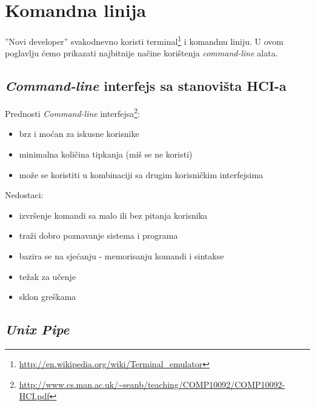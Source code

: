 \documentclass[times, utf8, seminar]{fit}
\begin{document}
\chapter{Komandna linija}

''Novi developer'' svakodnevno koristi terminal\footnote{\url{http://en.wikipedia.org/wiki/Terminal_emulator}} i komandnu liniju. U ovom poglavlju ćemo prikazati najbitnije načine korištenja \emph{command-line} alata.

\section{\emph{Command-line} interfejs sa stanovišta HCI-a}

Prednosti \emph{Command-line} interfejsa\footnote{\url{http://www.cs.man.ac.uk/~seanb/teaching/COMP10092/COMP10092-HCI.pdf}}:
\begin{itemize}
 \item brz i moćan za iskusne korisnike
 \item minimalna količina tipkanja (miš se ne koristi)
 \item može se koristiti u kombinaciji sa drugim korisničkim interfejsima
\end{itemize}

Nedostaci:
\begin{itemize}
\item izvršenje komandi sa malo ili bez pitanja korisnika
\item traži dobro poznavanje sistema i programa
\item bazira se na sjećanju - memorisanju komandi i sintakse
\item težak za učenje
\item sklon greškama
\end{itemize}

%
%
%
%
%

\section{\emph{Unix Pipe}}
\end{document}
